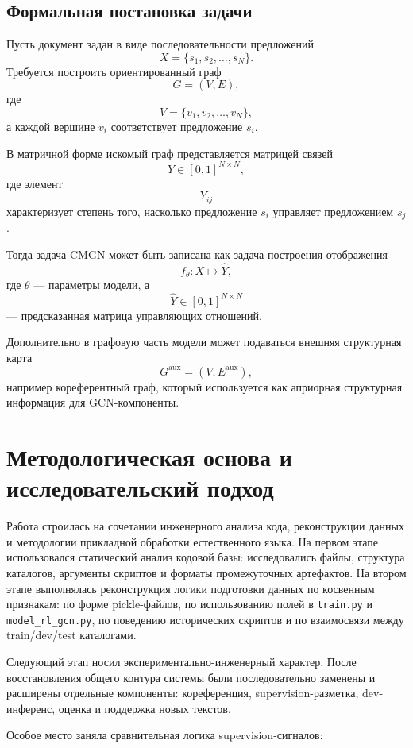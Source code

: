 \documentclass[12pt,a4paper]{article}
\begin{document}
\subsection{Формальная постановка задачи}

Пусть документ задан в виде последовательности предложений
\[
X = \{s_1, s_2, \dots, s_N\}.
\]
Требуется построить ориентированный граф
\[
G = (V, E),
\]
где
\[
V = \{v_1, v_2, \dots, v_N\},
\]
а каждой вершине $v_i$ соответствует предложение $s_i$.

В матричной форме искомый граф представляется матрицей связей
\[
Y \in [0,1]^{N \times N},
\]
где элемент
\[
Y_{ij}
\]
характеризует степень того, насколько предложение $s_i$ управляет предложением $s_j$.

Тогда задача CMGN может быть записана как задача построения отображения
\[
f_{\theta}: X \mapsto \hat{Y},
\]
где $\theta$ --- параметры модели, а
\[
\hat{Y} \in [0,1]^{N \times N}
\]
--- предсказанная матрица управляющих отношений.

Дополнительно в графовую часть модели может подаваться внешняя структурная карта
\[
G^{\text{aux}} = (V, E^{\text{aux}}),
\]
например кореферентный граф, который используется как априорная структурная информация
для GCN-компоненты.

\section{Методологическая основа и исследовательский подход}

Работа строилась на сочетании инженерного анализа кода, реконструкции данных и
методологии прикладной обработки естественного языка. На первом этапе использовался
статический анализ кодовой базы: исследовались файлы, структура каталогов, аргументы
скриптов и форматы промежуточных артефактов. На втором этапе выполнялась реконструкция
логики подготовки данных по косвенным признакам: по форме pickle-файлов, по использованию
полей в \texttt{train.py} и \texttt{model\_rl\_gcn.py}, по поведению исторических
скриптов и по взаимосвязи между train/dev/test каталогами.

Следующий этап носил экспериментально-инженерный характер. После восстановления общего
контура системы были последовательно заменены и расширены отдельные компоненты:
кореференция, supervision-разметка, dev-инференс, оценка и поддержка новых текстов.
\newline

Особое место заняла сравнительная логика supervision-сигналов:
\end{document}
